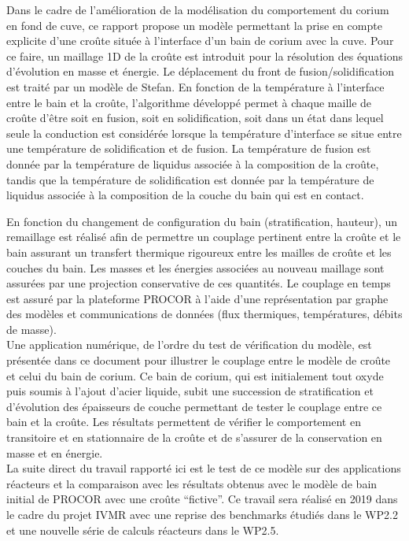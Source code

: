 Dans le cadre de l'amélioration de la modélisation du comportement du corium en fond de cuve, ce rapport propose un modèle permettant la prise en compte explicite d'une croûte située à l'interface d'un bain de corium avec la cuve. Pour ce faire, un maillage 1D de la croûte est introduit pour la résolution des équations d'évolution en masse et énergie. Le déplacement du front de fusion/solidification est traité par un modèle de Stefan. En fonction de la température à l'interface entre le bain et la croûte, l'algorithme développé permet à chaque maille de croûte d'être soit en fusion, soit en solidification, soit dans un état dans lequel seule la conduction est considérée lorsque la température d'interface se situe entre une température de solidification et de fusion. La température de fusion est donnée par la température de liquidus associée à la composition de la croûte, tandis que la température de solidification est donnée par la température de liquidus associée à la composition de la couche du bain qui est en contact. 

En fonction du changement de configuration du bain (stratification, hauteur), un remaillage est réalisé afin de permettre un couplage pertinent entre la croûte et le bain assurant un transfert thermique rigoureux entre les mailles de croûte et les couches du bain. Les masses et les énergies associées au nouveau maillage sont assurées par une projection conservative de ces quantités. Le couplage en temps est assuré par la plateforme PROCOR à l'aide d'une représentation par graphe des modèles et communications de données (flux thermiques, températures, débits de masse).\\

Une application numérique, de l'ordre du test de vérification du modèle, est présentée dans ce document pour illustrer le couplage entre le modèle de croûte et celui du bain de corium. Ce bain de corium, qui est initialement tout oxyde puis soumis à l'ajout d'acier liquide, subit une succession de stratification et d'évolution des épaisseurs de couche permettant de tester le couplage entre ce bain et la croûte. Les résultats permettent de vérifier le comportement en transitoire et en stationnaire de la croûte et de s'assurer de la conservation en masse et en énergie.\\

La suite direct du travail rapporté ici est le test de ce modèle sur des applications réacteurs et la comparaison avec les résultats obtenus avec le modèle de bain initial de PROCOR avec une croûte ``fictive''. Ce travail sera réalisé en 2019 dans le cadre du projet IVMR avec une reprise des benchmarks étudiés dans le WP2.2 et une nouvelle série de calculs réacteurs dans le WP2.5.


